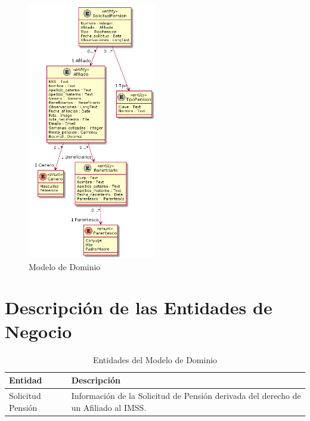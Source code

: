 
\begin{figure}[ht]
	\label{tab:uml-domain-model}
	\includegraphics[width=0.5\textwidth]{uml-diagrams/domain-model.png}
	\caption{Modelo de Dominio}
\end{figure}

\section{Descripción de las Entidades de Negocio} \label{sec:entity-description}

\begin{table}[ht]
	\caption{Entidades del Modelo de Dominio}
	\label{tab:entities}
	\begin{center}
	\begin{tabular}{ l l }
		\hline
		\textbf{Entidad} & \textbf{Descripción} \\
		\hline
		Solicitud Pensión & Información de la Solicitud de Pensión derivada del derecho de un Afiliado al IMSS. \\
		\hline
	\end{tabular}
	\end{center}
\end{table}

